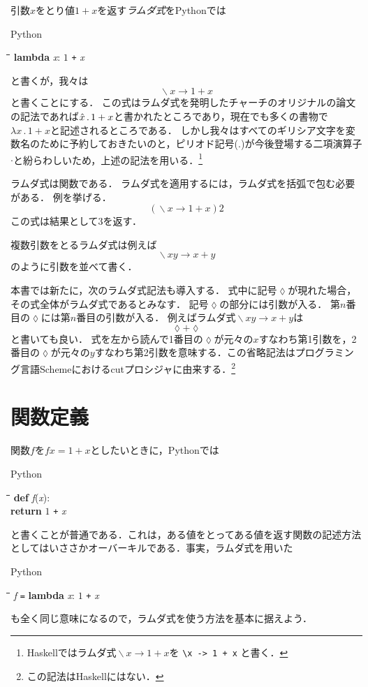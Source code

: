 \documentclass[twocolumn]{jsbook}
\newcommand{\keyword}[1]{{\emph{#1}}}
\newcommand{\code}[1]{\texttt{#1}}
\newenvironment{pythoncode}{\begin{itembox}[r]{Python}}{\end{itembox}}
\newenvironment{python}{\begin{tabbing}\hspace*{1em}\=\hspace*{1em}\=\hspace*{1em}\=\hspace*{1em}\=\kill}{\end{tabbing}}
\newcommand{\pthnId}[1]{\textit{#1}}
\newcommand{\pthnKeyword}[1]{\textbf{#1}}
\newcommand{\pthnOp}[1]{\texttt{#1}}
\DeclareMathOperator{\mathLambda}{\backslash}
\newcommand{\mathLambdaAnonymousParameter}{\lozenge}
\newcommand{\mathLambdaArrow}{\rightarrow}
\newcommand{\mathLambdaExpression}[2]{\mathLambda#1\mathLambdaArrow#2}
\begin{document}
引数$x$をとり値$1+x$を返す\keyword{ラムダ式}をPythonでは
\begin{pythoncode}
\begin{python}
\pthnKeyword{lambda} \pthnId{x}: $1$ \pthnOp{+} \pthnId{x}
\end{python}
\end{pythoncode}
と書くが，我々は$$\mathLambdaExpression{x}{1+x}$$と書くことにする．
この式はラムダ式を発明したチャーチのオリジナルの論文の記法であれば$\Hat x\,.\,1+x$と書かれたところであり，現在でも多くの書物で$\lambda x\,.\,1+x$と記述されるところである．
しかし我々はすべてのギリシア文字を変数名のために予約しておきたいのと，ピリオド記号($.$)が今後登場する二項演算子$\cdot$と紛らわしいため，上述の記法を用いる．\footnote{Haskellではラムダ式$\mathLambdaExpression{x}{1+x}$を \code{\textbackslash x -> 1 + x} と書く．}

ラムダ式は関数である．
ラムダ式を適用するには，ラムダ式を括弧で包む必要がある．
例を挙げる．
$$\left(\mathLambdaExpression{x}{1+x}\right)2$$
この式は結果として$3$を返す．

複数引数をとるラムダ式は例えば$$\mathLambdaExpression{xy}{x+y}$$のように引数を並べて書く．

本書では新たに，次のラムダ式記法も導入する．
式中に記号$\mathLambdaAnonymousParameter$が現れた場合，その式全体がラムダ式であるとみなす．
記号$\mathLambdaAnonymousParameter$の部分には引数が入る．
第$n$番目の$\mathLambdaAnonymousParameter$には第$n$番目の引数が入る．
例えばラムダ式$\mathLambdaExpression{xy}{x+y}$は$$\mathLambdaAnonymousParameter+\mathLambdaAnonymousParameter$$と書いても良い．
式を左から読んで1番目の$\mathLambdaAnonymousParameter$が元々の$x$すなわち第1引数を，2番目の$\mathLambdaAnonymousParameter$が元々の$y$すなわち第2引数を意味する．この省略記法はプログラミング言語Schemeにおけるcutプロシジャに由来する．\footnote{この記法はHaskellにはない．}



\section{関数定義}

関数$f$を$fx=1+x$としたいときに，Pythonでは
\begin{pythoncode}
\begin{python}
\pthnKeyword{def} \pthnId{f}(\pthnId{x}):\\
\>\pthnKeyword{return} $1$ \pthnOp{+} \pthnId{x}
\end{python}
\end{pythoncode}
と書くことが普通である．これは，ある値をとってある値を返す関数の記述方法としてはいささかオーバーキルである．事実，ラムダ式を用いた
\begin{pythoncode}
\begin{python}
\pthnId{f} \pthnOp{=} \pthnKeyword{lambda} \pthnId{x}: $1$ \pthnOp{+} \pthnId{x}
\end{python}
\end{pythoncode}
も全く同じ意味になるので，ラムダ式を使う方法を基本に据えよう．
\end{document}
